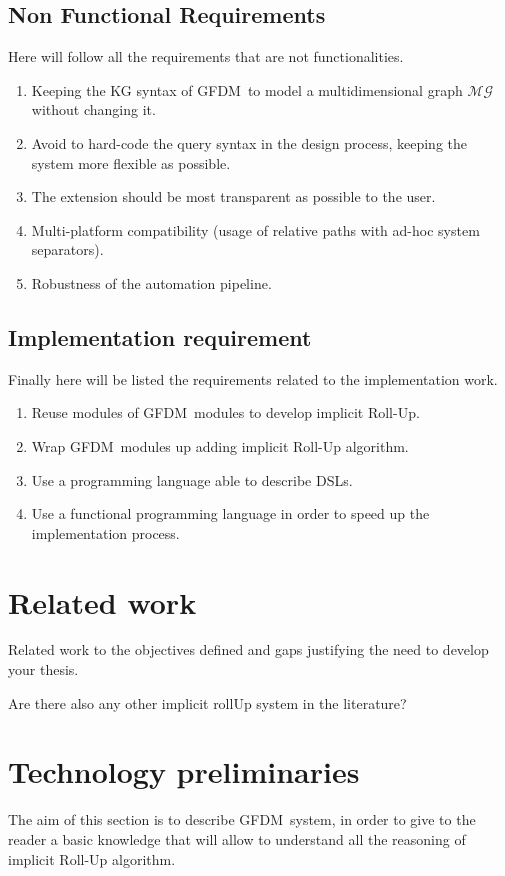 \documentclass[12pt,a4paper]{report}
\newcommand\systemName{GFDM}
\newcommand\multidimensionalGraph{\mathcal{MG}}
\begin{document}
\section{Non Functional Requirements}
Here will follow all the requirements that are not functionalities.
%
\begin{enumerate}
    \item Keeping the KG syntax of \systemName\, to model a multidimensional graph $\multidimensionalGraph$ without changing it.
    \item Avoid to hard-code the query syntax in the design process, keeping the system more flexible as possible.
    \item The extension should be most transparent as possible to the user.
    \item Multi-platform compatibility (usage of relative paths with ad-hoc system separators).
    \item Robustness of the automation pipeline.
\end{enumerate}
\section{Implementation requirement}
Finally here will be listed the requirements related to the implementation work.
%
\begin{enumerate}
    \item Reuse modules of \systemName\, modules to develop implicit Roll-Up.
    \item Wrap \systemName\, modules up adding implicit Roll-Up algorithm.
    \item Use a programming language able to describe DSLs.
    \item Use a functional programming language in order to speed up the implementation process.
\end{enumerate}


\chapter{Related work} \label{Related work}
Related work to the objectives defined and gaps justifying the need to develop your thesis.

Are there also any other implicit rollUp system in the literature?

\chapter{Technology preliminaries}\label{Technology preliminaries}
The aim of this section is to describe \systemName\, system, in order to give to the reader a basic knowledge that will allow to understand all the reasoning of implicit Roll-Up algorithm.
\end{document}
